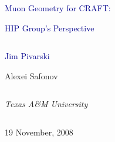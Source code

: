 \documentclass[compress]{beamer}
\begin{document}
\begin{frame}
\vfill
\begin{center}
\textcolor{darkblue}{\Large Muon Geometry for CRAFT:}

\vspace{0.2 cm}
\textcolor{darkblue}{\Large HIP Group's Perspective}

\vfill
\begin{columns}
\begin{center}
\large
\textcolor{darkblue}{Jim Pivarski}

\vspace{0.2 cm}
Alexei Safonov
\end{center}
\end{columns}

\begin{columns}
\begin{center}
\scriptsize
{\it Texas A\&M University}
\end{center}
\end{columns}

\vfill
19 November, 2008

\end{center}
\end{frame}


\small
\end{document}
